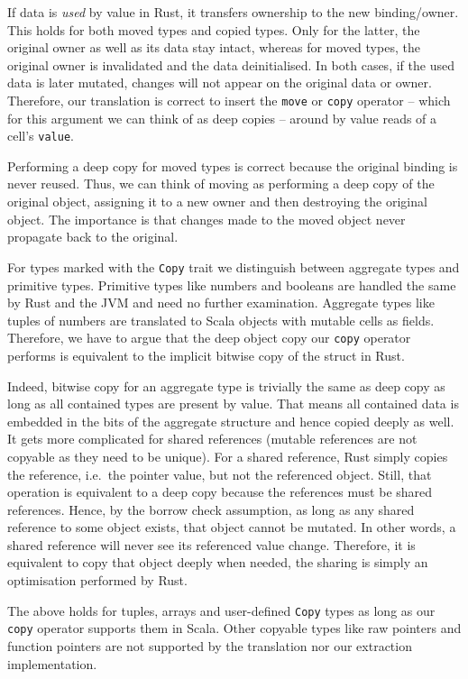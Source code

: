 If data is \emph{used} by value in Rust, it transfers ownership to the
new binding/owner. This holds for both moved types and copied types.
Only for the latter, the original owner as well as its data stay intact,
whereas for moved types, the original owner is invalidated and the data
deinitialised. In both cases, if the used data is later mutated, changes
will not appear on the original data or owner. Therefore, our
translation is correct to insert the \passthrough{\lstinline!move!} or
\passthrough{\lstinline!copy!} operator -- which for this argument we
can think of as deep copies -- around by value reads of a cell's
\passthrough{\lstinline!value!}.

Performing a deep copy for moved types is correct because the original
binding is never reused. Thus, we can think of moving as performing a
deep copy of the original object, assigning it to a new owner and then
destroying the original object. The importance is that changes made to
the moved object never propagate back to the original.

For types marked with the \passthrough{\lstinline!Copy!} trait we
distinguish between aggregate types and primitive types. Primitive types
like numbers and booleans are handled the same by Rust and the JVM and
need no further examination. Aggregate types like tuples of numbers are
translated to Scala objects with mutable cells as fields. Therefore, we
have to argue that the deep object copy our
\passthrough{\lstinline!copy!} operator performs is equivalent to the
implicit bitwise copy of the struct in Rust.

Indeed, bitwise copy for an aggregate type is trivially the same as deep
copy as long as all contained types are present by value. That means all
contained data is embedded in the bits of the aggregate structure and
hence copied deeply as well. It gets more complicated for shared
references (mutable references are not copyable as they need to be
unique). For a shared reference, Rust simply copies the reference,
i.e.~the pointer value, but not the referenced object. Still, that
operation is equivalent to a deep copy because the references must be
shared references. Hence, by the borrow check assumption, as long as any
shared reference to some object exists, that object cannot be mutated.
In other words, a shared reference will never see its referenced value
change. Therefore, it is equivalent to copy that object deeply when
needed, the sharing is simply an optimisation performed by Rust.

The above holds for tuples, arrays and user-defined
\passthrough{\lstinline!Copy!} types as long as our
\passthrough{\lstinline!copy!} operator supports them in Scala. Other
copyable types like raw pointers and function pointers are not supported
by the translation nor our extraction implementation.


